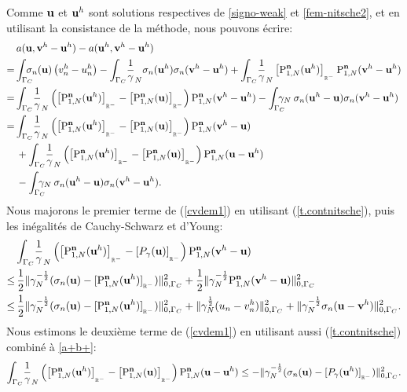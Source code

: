 \documentclass[11pt]{book}
\def\u{{\bf u}}
\def\n{{\bf n}}
\def\vv{{\bf v}}
\newcommand{\ds}{\displaystyle}
\newcommand{\R}{\mathbb{R}}
\newcommand{\Gc}{\Gamma_{C}}
\newcommand{\dg}{d\Gamma}
\newcommand{\igc}{{\ds\int_{\Gc}\hspace*{-0.7em}}}
\newcommand{\sn}{{\sigma_n}}
\newcommand{\gN}{\gamma_{N}}
\newcommand{\Pgh}{P_{\gamma}}
\newcommand{\PNgh}{\mathrm{P}^{\n}_{1, N}}
\newcommand{\pn}[1]{\left [ #1 \right ]_{_{\R^-}}}
\newcommand{\pns}[1]{ [ #1 ]_{_{\R^-}}}
\begin{document}
Comme $\u$ et $\u^h$
sont solutions respectives de \eqref{signo-weak} et \eqref{fem-nitsche2}, et 
en utilisant la consistance de la méthode,
nous pouvons écrire: 
\begin{align}
& a ( \u  , \vv^h - \u^h ) - a ( \u^h , \vv^h - \u^h ) \nonumber \\ =\,&  \igc \sn(\u) \left( v^h_n - u^h_n \right)  %
- \igc  \:\:\: \frac1\gN \sn(\u^h) \sn ( \vv^h - \u^h )  %
+ \igc \:\:\: \frac1\gN \pn{ \PNgh (\u^h) } \PNgh ( \vv^h - \u^h ) %
\nonumber \\
=\,&  \igc \:\:\: \frac1\gN  \left( \pn{ \PNgh (\u^h) } - \pn{ \PNgh (\u) } \right)   \PNgh ( \vv^h - \u^h ) %
- \igc \gN \: \sn(\u^h-\u) \sn ( \vv^h - \u^h )  %
\nonumber \\
=\,&  \igc \:\:\: \frac1\gN  \left( \pn{ \PNgh (\u^h) } - \pn{ \PNgh (\u) } \right)   \PNgh ( \vv^h - \u ) %
\nonumber\\&+
 \igc \:\:\: \frac1\gN  \left( \pn{ \PNgh (\u^h) } - \pn{ \PNgh (\u) } \right)   \PNgh ( \u - \u^h ) %
 \nonumber \\
&- \igc \gN \: \sn(\u^h-\u) \sn ( \vv^h - \u^h ). %
\label{cvdem1}
\end{align}
Nous majorons le premier terme de (\ref{cvdem1}) en utilisant (\ref{t.contnitsche}), puis les inégalités de Cauchy-Schwarz et d'Young:
\begin{align}
& \igc \:\:\: \frac1\gN  \left( \pn{ \PNgh (\u^h) } - \pn{ \Pgh (\u) } \right)   \PNgh ( \vv^h - \u ) %
\nonumber \\ \le \, & \frac{1}{2} \| \gN^{-\frac12} ( \sn(\u) - \pns{ \PNgh (\u^h) } ) \|^2_{0,\Gamma_C}  +  \frac{1}{2} \|  \gN^{-\frac12}  \PNgh ( \vv^h - \u )   \|^2_{0,\Gamma_C}
\nonumber \\ \le \, & \frac{1}{2} \| \gN^{-\frac12} ( \sn(\u) - \pns{ \PNgh (\u^h) } ) \|^2_{0,\Gamma_C}  +  \| \gN^{\frac12} ( u_n - v^h_n  ) \|^2_{0,\Gamma_C} + 
\| \gN^{-\frac12} \sn(\u - \vv^h) \|^2_{0,\Gamma_C}. \label{cvdem1b}
\end{align}
Nous estimons le deuxième terme de (\ref{cvdem1}) en utilisant aussi  (\ref{t.contnitsche}) combiné à \eqref{a+b+}: %
\begin{align}
 \igc \:\:\: \frac1\gN  \left( \pn{ \PNgh (\u^h) } - \pn{ \PNgh (\u) } \right)   \PNgh ( \u - \u^h ) %
 \le - \| \gN^{-\frac12} ( \sn(\u) - \pns{ \Pgh (\u^h) } ) \|^2_{0,\Gamma_C}. \label{cvdem1c}
\end{align}
\end{document}
